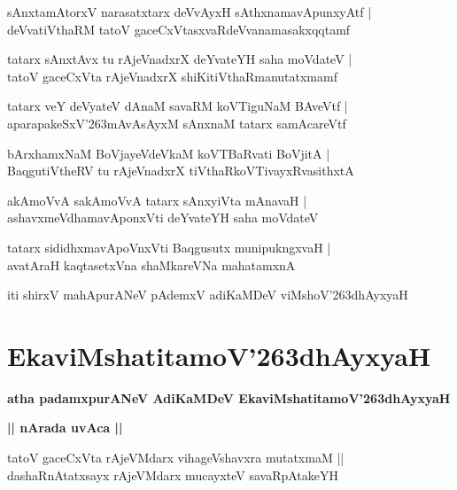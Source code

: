 \documentclass[twoside,12pt,openright]{book}
\def\S{\char'263}
\newcounter{shloka}[chapter]
\def\uvaca#1{\centerline{{\large\textbf{#1}}}}
\begin{document}
\begin{shloka}
sAnxtamAtorxV narasatxtarx deVvAyxH sAthxnamavApunxyAtf |\\
deVvatiVthaRM tatoV gaceCxVtasxvaRdeVvanamasakxqqtamf 
\end{shloka}

\begin{shloka}
tatarx sAnxtAvx tu rAjeVnadxrX deYvateYH saha moVdateV |\\
tatoV gaceCxVta rAjeVnadxrX shiKitiVthaRmanutatxmamf 
\end{shloka}

\begin{shloka}
tatarx veY deVyateV dAnaM savaRM koVTiguNaM BAveVtf |\\
aparapakeSxV\S mAvAsAyxM sAnxnaM tatarx samAcareVtf 
\end{shloka}

\begin{shloka}
bArxhamxNaM BoVjayeVdeVkaM koVTBaRvati BoVjitA |\\
BaqgutiVtheRV tu rAjeVnadxrX tiVthaRkoVTivayxRvasithxtA
\end{shloka}

\begin{shloka}
akAmoVvA sakAmoVvA tatarx sAnxyiVta mAnavaH |\\
ashavxmeVdhamavAponxVti deYvateYH saha moVdateV
\end{shloka}

\begin{shloka}
tatarx sididhxmavApoVnxVti Baqgusutx munipukngxvaH |\\
avatAraH kaqtasetxVna shaMkareVNa mahatamxnA
\end{shloka}


\begin{center}
iti shirxV mahApurANeV pAdemxV adiKaMDeV viMshoV\S dhAyxyaH
\end{center}

\chapter{EkaviMshatitamoV\S dhAyxyaH}

\begin{center}
{\LARGE\bfseries atha padamxpurANeV AdiKaMDeV EkaviMshatitamoV\S dhAyxyaH}
\end{center}

\uvaca{|| nArada uvAca ||}


\begin{shloka}
tatoV gaceCxVta rAjeVMdarx vihageVshavxra mutatxmaM ||\\
dashaRnAtatxsayx rAjeVMdarx mucayxteV  savaRpAtakeYH
\end{shloka}
\end{document}
